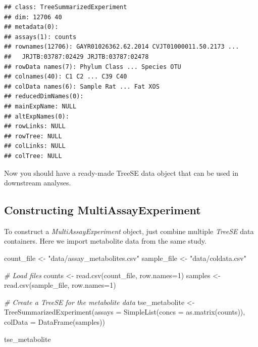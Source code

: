 \documentclass[
]{book}
\newenvironment{Shaded}{\begin{snugshade}}{\end{snugshade}}
\newcommand{\AttributeTok}[1]{\textcolor[rgb]{0.77,0.63,0.00}{#1}}
\newcommand{\CommentTok}[1]{\textcolor[rgb]{0.56,0.35,0.01}{\textit{#1}}}
\newcommand{\DecValTok}[1]{\textcolor[rgb]{0.00,0.00,0.81}{#1}}
\newcommand{\FunctionTok}[1]{\textcolor[rgb]{0.00,0.00,0.00}{#1}}
\newcommand{\NormalTok}[1]{#1}
\newcommand{\OtherTok}[1]{\textcolor[rgb]{0.56,0.35,0.01}{#1}}
\newcommand{\StringTok}[1]{\textcolor[rgb]{0.31,0.60,0.02}{#1}}
\begin{document}
\begin{verbatim}
## class: TreeSummarizedExperiment 
## dim: 12706 40 
## metadata(0):
## assays(1): counts
## rownames(12706): GAYR01026362.62.2014 CVJT01000011.50.2173 ...
##   JRJTB:03787:02429 JRJTB:03787:02478
## rowData names(7): Phylum Class ... Species OTU
## colnames(40): C1 C2 ... C39 C40
## colData names(6): Sample Rat ... Fat XOS
## reducedDimNames(0):
## mainExpName: NULL
## altExpNames(0):
## rowLinks: NULL
## rowTree: NULL
## colLinks: NULL
## colTree: NULL
\end{verbatim}

Now you should have a ready-made TreeSE data object that can be used in downstream analyses.

\hypertarget{constructing-multiassayexperiment}{%
\subsection{Constructing MultiAssayExperiment}\label{constructing-multiassayexperiment}}

To construct a \emph{MultiAssayExperiment} object, just combine multiple \emph{TreeSE} data containers.
Here we import metabolite data from the same study.

\begin{Shaded}
\begin{Highlighting}[]
\NormalTok{count\_file }\OtherTok{\textless{}{-}} \StringTok{"data/assay\_metabolites.csv"}
\NormalTok{sample\_file }\OtherTok{\textless{}{-}} \StringTok{"data/coldata.csv"}

\CommentTok{\# Load files}
\NormalTok{counts  }\OtherTok{\textless{}{-}} \FunctionTok{read.csv}\NormalTok{(count\_file, }\AttributeTok{row.names=}\DecValTok{1}\NormalTok{)  }
\NormalTok{samples }\OtherTok{\textless{}{-}} \FunctionTok{read.csv}\NormalTok{(sample\_file, }\AttributeTok{row.names=}\DecValTok{1}\NormalTok{)}

\CommentTok{\# Create a TreeSE for the metabolite data}
\NormalTok{tse\_metabolite }\OtherTok{\textless{}{-}} \FunctionTok{TreeSummarizedExperiment}\NormalTok{(}\AttributeTok{assays =} \FunctionTok{SimpleList}\NormalTok{(}\AttributeTok{concs =} \FunctionTok{as.matrix}\NormalTok{(counts)),}
                                           \AttributeTok{colData =} \FunctionTok{DataFrame}\NormalTok{(samples))}

\NormalTok{tse\_metabolite}
\end{Highlighting}
\end{Shaded}
\end{document}

